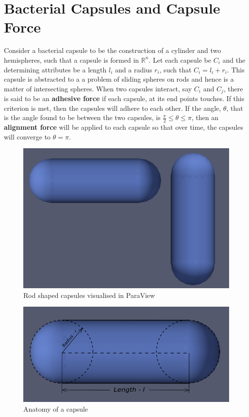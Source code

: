 \documentclass[journal, a4paper]{IEEEtran}
\begin{document}
\section{Bacterial Capsules and Capsule Force}
	Consider a bacterial capsule to be the construction of a cylinder and two hemispheres, such that a capsule is formed in $\mathbb{R}^n$. Let each capsule be $C_i$ and the determining attributes be a length $l_i$ and a radius $r_i$, such that $C_i = l_i+r_i$. This capsule is abstracted to a a problem of sliding spheres on rods and hence is a matter of intersecting spheres. When two capsules interact, say $C_i$ and $C_j$, there is said to be an \textbf{adhesive force} if each capsule, at its end points touches. If this criterion is met, then the capsules will adhere to each other. If the angle, $\theta$, that is the angle found to be between the two capsules, is $\frac{\pi}{2} \leq \theta \leq \pi $, then an \textbf{alignment force} will be applied to each capsule so that over time, the capsules will converge to $\theta = \pi$.
	\begin{figure}[H]
	    \centering
	    \includegraphics[scale = 0.22]{TwoCapsules.png}
	    \caption{Rod shaped capsules visualised in ParaView}
	    \label{fig:two_capsules}
	\end{figure}
		\begin{figure}[H]
	    \centering
	    \includegraphics[scale = 0.32]{AnatomyOfCapsules.png}
	    \caption{Anatomy of a capsule}
	    \label{fig:anatomy_capsules}
	\end{figure}
\end{document}
